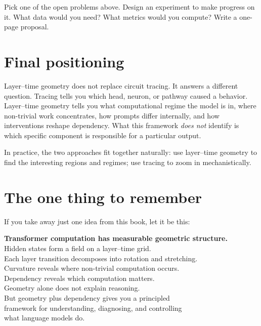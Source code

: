 \documentclass[11pt, twoside, openright]{memoir}
\begin{document}
\begin{tryit}
Pick one of the open problems above. Design an experiment to make
progress on it. What data would you need? What metrics would you
compute? Write a one-page proposal.
\end{tryit}

\section{Final positioning}

Layer--time geometry does not replace circuit tracing. It answers a different
question. Tracing tells you which head, neuron, or pathway caused a
behavior. Layer--time geometry tells you what computational regime the model
is in, where non-trivial work concentrates, how prompts differ internally,
and how interventions reshape dependency. What this framework \emph{does not}
identify is which specific component is responsible for a particular output.

In practice, the two approaches fit together naturally: use layer--time
geometry to find the interesting regions and regimes; use tracing to zoom in
mechanistically.

\section{The one thing to remember}

If you take away just one idea from this book, let it be this:

\begin{tcolorbox}[base, colback=LGreen, colframe=DGreen, boxrule=2pt]
\centering\large
\textbf{Transformer computation has measurable geometric structure.}\\[6pt]
\normalsize
Hidden states form a field on a layer--time grid.\\
Each layer transition decomposes into rotation and stretching.\\
Curvature reveals where non-trivial computation occurs.\\
Dependency reveals which computation matters.\\[6pt]
Geometry alone does not explain reasoning.\\
But geometry plus dependency gives you a principled\\
framework for understanding, diagnosing, and controlling\\
what language models do.
\end{tcolorbox}
\end{document}
